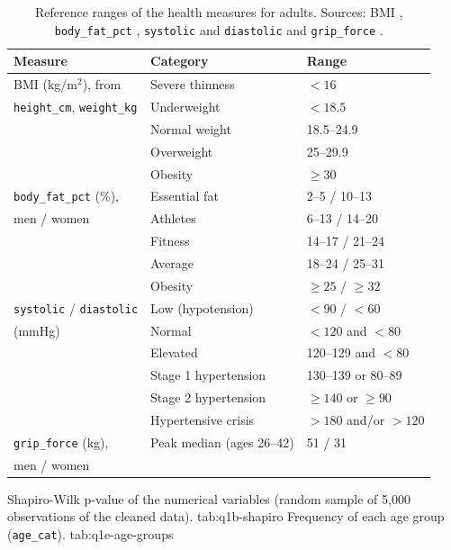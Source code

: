 \begin{table}[htbp]
  \centering
  \footnotesize
  \caption{Reference ranges of the health measures for adults. Sources: BMI \citep{who1995, who2000}, \texttt{body\_fat\_pct} \citep{ace_bodyfat}, \texttt{systolic} and \texttt{diastolic} \citep{nhs_hypotension, whelton2018} and \texttt{grip\_force} \citep{dodds2014}.}
  \label{tab:q1b-reference}
  \begin{tabular}{lll}
    \toprule
    Measure & Category & Range \\
    \midrule
    BMI (kg/m$^2$), from
      & Severe thinness       & $< 16$ \\
    \quad \texttt{height\_cm}, \texttt{weight\_kg}
      & Underweight           & $< 18.5$ \\
      & Normal weight         & 18.5--24.9 \\
      & Overweight            & 25--29.9 \\
      & Obesity               & $\geq 30$ \\
    \midrule
    \texttt{body\_fat\_pct} (\%),
      & Essential fat         & 2--5 / 10--13 \\
    \quad men / women
      & Athletes              & 6--13 / 14--20 \\
      & Fitness               & 14--17 / 21--24 \\
      & Average               & 18--24 / 25--31 \\
      & Obesity               & $\geq 25$ / $\geq 32$ \\
    \midrule
    \texttt{systolic} / \texttt{diastolic}
      & Low (hypotension)     & $< 90$ / $< 60$ \\
    \quad (mmHg)
      & Normal                & $< 120$ and $< 80$ \\
      & Elevated              & 120--129 and $< 80$ \\
      & Stage 1 hypertension  & 130--139 or 80--89 \\
      & Stage 2 hypertension  & $\geq 140$ or $\geq 90$ \\
      & Hypertensive crisis   & $> 180$ and/or $> 120$ \\
    \midrule
    \texttt{grip\_force} (kg),
      & Peak median (ages 26--42) & 51 / 31 \\
    \quad men / women & & \\
    \bottomrule
  \end{tabular}
\end{table}

  {Shapiro-Wilk p-value of the numerical variables (random sample of 5,000 observations of the cleaned data).}
  {tab:q1b-shapiro}
  {Frequency of each age group (\texttt{age\_cat}).}
  {tab:q1e-age-groups}

